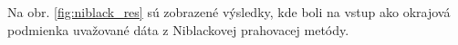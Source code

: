 \documentclass[a4paper,12pt,twoside]{article}%
\begin{document}
Na obr. \ref{fig:niblack_res} sú zobrazené výsledky, kde boli na vstup ako okrajová podmienka uvažované dáta z Niblackovej prahovacej metódy.

\begin{figure}[H]  
    \hspace{5px}

\end{figure}
\end{document}
